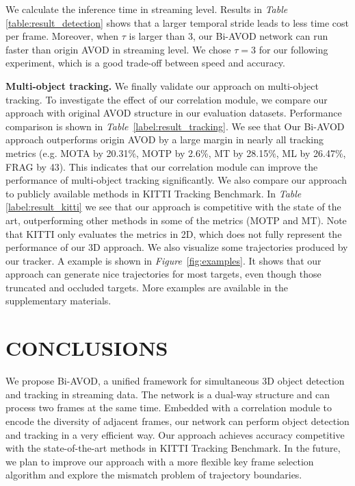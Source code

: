 \documentclass[letterpaper, 10 pt, conference]{ieeeconf}  %
\def\figurename{\emph{Figure}}
\def\tablename{\emph{Table}}
\begin{document}
We calculate the inference time in streaming level. Results in  \tablename \, \ref{table:result_detection} shows that a larger temporal stride leads to less time cost per frame. Moreover, when $\tau$ is larger than 3, our Bi-AVOD network can run faster than origin AVOD in streaming level. We chose $\tau = 3$ for our following experiment, which is a good trade-off between speed and accuracy.

\textbf{Multi-object tracking.} We finally validate our approach on multi-object tracking. To investigate the effect of our correlation module, we compare our approach with original AVOD structure in our evaluation datasets. Performance comparison is shown in  \tablename \, \ref{label:result_tracking}. We see that Our Bi-AVOD approach outperforms origin AVOD by a large margin in nearly all tracking metrics (e.g. MOTA by 20.31\%, MOTP by 2.6\%, MT by 28.15\%, ML by 26.47\%, FRAG by 43). This indicates that our correlation module can improve the performance of multi-object tracking significantly. We also compare our approach to publicly available methods in KITTI Tracking Benchmark. In \tablename \, \ref{label:result_kitti} we see that our approach is competitive with the state of the art, outperforming other methods in some of the metrics (MOTP and MT). Note that KITTI only evaluates the metrics in 2D, which does not fully represent the performance of our 3D approach.
We also visualize some trajectories produced by our tracker. A example is shown in \figurename \, \ref{fig:examples}. It shows that our approach can generate nice trajectories for most targets, even though those truncated and occluded targets. More examples are available in the supplementary materials. 


\section{CONCLUSIONS}

\label{sec:conclusions} We propose Bi-AVOD, a unified framework for simultaneous 3D object detection and tracking in streaming data. The network is a dual-way structure and can  process two frames at the same time. Embedded with a correlation module to encode the diversity of adjacent frames, our network can perform object detection and tracking in a very efficient way. Our approach achieves accuracy competitive with the state-of-the-art methods in KITTI Tracking Benchmark. In the future, we plan to improve our approach with a more flexible key frame selection algorithm and explore the mismatch problem of trajectory boundaries.




\end{document}
